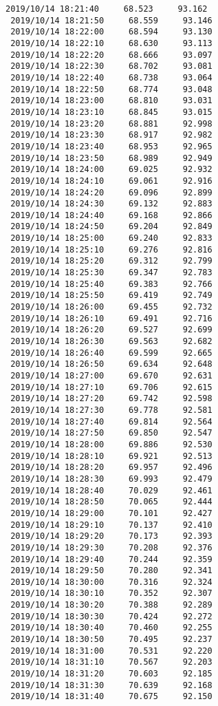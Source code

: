 \documentclass[11pt]{article}
\begin{document}
\begin{Verbatim}[commandchars=\\\{\}]
 2019/10/14 18:21:40     68.523     93.162
 2019/10/14 18:21:50     68.559     93.146
 2019/10/14 18:22:00     68.594     93.130
 2019/10/14 18:22:10     68.630     93.113
 2019/10/14 18:22:20     68.666     93.097
 2019/10/14 18:22:30     68.702     93.081
 2019/10/14 18:22:40     68.738     93.064
 2019/10/14 18:22:50     68.774     93.048
 2019/10/14 18:23:00     68.810     93.031
 2019/10/14 18:23:10     68.845     93.015
 2019/10/14 18:23:20     68.881     92.998
 2019/10/14 18:23:30     68.917     92.982
 2019/10/14 18:23:40     68.953     92.965
 2019/10/14 18:23:50     68.989     92.949
 2019/10/14 18:24:00     69.025     92.932
 2019/10/14 18:24:10     69.061     92.916
 2019/10/14 18:24:20     69.096     92.899
 2019/10/14 18:24:30     69.132     92.883
 2019/10/14 18:24:40     69.168     92.866
 2019/10/14 18:24:50     69.204     92.849
 2019/10/14 18:25:00     69.240     92.833
 2019/10/14 18:25:10     69.276     92.816
 2019/10/14 18:25:20     69.312     92.799
 2019/10/14 18:25:30     69.347     92.783
 2019/10/14 18:25:40     69.383     92.766
 2019/10/14 18:25:50     69.419     92.749
 2019/10/14 18:26:00     69.455     92.732
 2019/10/14 18:26:10     69.491     92.716
 2019/10/14 18:26:20     69.527     92.699
 2019/10/14 18:26:30     69.563     92.682
 2019/10/14 18:26:40     69.599     92.665
 2019/10/14 18:26:50     69.634     92.648
 2019/10/14 18:27:00     69.670     92.631
 2019/10/14 18:27:10     69.706     92.615
 2019/10/14 18:27:20     69.742     92.598
 2019/10/14 18:27:30     69.778     92.581
 2019/10/14 18:27:40     69.814     92.564
 2019/10/14 18:27:50     69.850     92.547
 2019/10/14 18:28:00     69.886     92.530
 2019/10/14 18:28:10     69.921     92.513
 2019/10/14 18:28:20     69.957     92.496
 2019/10/14 18:28:30     69.993     92.479
 2019/10/14 18:28:40     70.029     92.461
 2019/10/14 18:28:50     70.065     92.444
 2019/10/14 18:29:00     70.101     92.427
 2019/10/14 18:29:10     70.137     92.410
 2019/10/14 18:29:20     70.173     92.393
 2019/10/14 18:29:30     70.208     92.376
 2019/10/14 18:29:40     70.244     92.359
 2019/10/14 18:29:50     70.280     92.341
 2019/10/14 18:30:00     70.316     92.324
 2019/10/14 18:30:10     70.352     92.307
 2019/10/14 18:30:20     70.388     92.289
 2019/10/14 18:30:30     70.424     92.272
 2019/10/14 18:30:40     70.460     92.255
 2019/10/14 18:30:50     70.495     92.237
 2019/10/14 18:31:00     70.531     92.220
 2019/10/14 18:31:10     70.567     92.203
 2019/10/14 18:31:20     70.603     92.185
 2019/10/14 18:31:30     70.639     92.168
 2019/10/14 18:31:40     70.675     92.150

\end{Verbatim}
\end{document}
